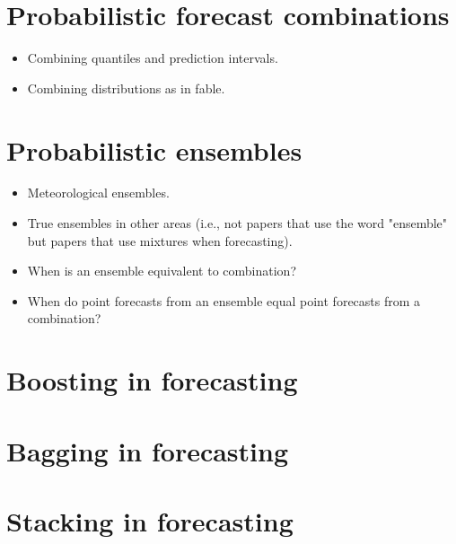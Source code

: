 \documentclass[11pt]{article}
\begin{document}
\section{Probabilistic forecast combinations}
\begin{itemize}
\item Combining quantiles and prediction intervals.
\item Combining distributions as in fable.
\end{itemize}

\citep{Genest1990-sr,Nowotarski2015-xu,Conflitti2015-fq,Billio2013-sg}



\section{Probabilistic ensembles}
\begin{itemize}
\item Meteorological ensembles.
\item True ensembles in other areas (i.e., not papers that use the word "ensemble" but papers that use mixtures when forecasting).
\item When is an ensemble equivalent to combination?
\item When do point forecasts from an ensemble equal point forecasts from a combination?
\end{itemize}

\section{Boosting in forecasting}
\section{Bagging in forecasting}
\section{Stacking in forecasting}




\end{document}
